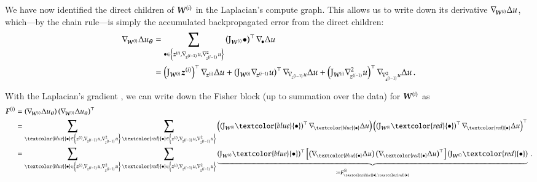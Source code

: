 We have now identified the direct children of ${\boldsymbol{W}}^{(i)}$ in the Laplacian's compute graph.
This allows us to write down its derivative $\nabla_{\!{{\boldsymbol{W}}^{(i)}}} \Delta u$, which---by the chain rule---is simply the accumulated backpropagated error from the direct children:
\begin{align}\label{eq:laplacian-gradient}
  \begin{split}
    \grad{\mW^{(i)}} \Delta u_{\vtheta}
    &=
      \sum_{\bullet \in \left\{ \vz^{(i)}, \grad{\vz^{(i-1)}}u, \gradsquared{\vz^{(i-1)}}u \right\}}
      \left(
      \jac_{\mW^{(i)}}\bullet
      \right)^{\top}
      \grad{\bullet}\Delta u
    \\
    &=
      \left(
      \jac_{\mW^{(i)}}\vz^{(i)}
      \right)^{\top}
      \grad{\vz^{(i)}}\Delta u
      +
      \left(
      \jac_{\mW^{(i)}}\grad{\vz^{(i-1)}}u
      \right)^{\top}
      \grad{\grad{\vz^{(i-1)}}u}\Delta u
      +
      \left(
      \jac_{\mW^{(i)}}\gradsquared{\vz^{(i-1)}}u
      \right)^{\top}
      \grad{\gradsquared{\vz^{(i-1)}}u}\Delta u\,.
  \end{split}
\end{align}

With the Laplacian's gradient , we can write down the Fisher block (up to summation over the data) for ${\boldsymbol{W}}^{(i)}$ as 
\begin{align}\label{eq:fisher}
  \begin{split}
    \mF^{(i)}
    &=
      \left(
      \grad{\mW^{(i)}} \Delta u_{\vtheta}
      \right)
      \left(
      \grad{\mW^{(i)}} \Delta u_{\vtheta}
      \right)^{\top}
    \\
    &=
      \sum_{\textcolor{blue}{\bullet} \in \left\{ \vz^{(i)}, \grad{\vz^{(i-1)}}u, \gradsquared{\vz^{(i-1)}}u \right\}}
      \sum_{\textcolor{red}{\bullet} \in \left\{ \vz^{(i)}, \grad{\vz^{(i-1)}}u, \gradsquared{\vz^{(i-1)}}u \right\}}
      \left(
      \left(
      \jac_{\mW^{(i)}}\textcolor{blue}{\bullet}
      \right)^{\top}
      \grad{\textcolor{blue}{\bullet}}\Delta u
      \right)
      \left(
      \left(
      \jac_{\mW^{(i)}}\textcolor{red}{\bullet}
      \right)^{\top}
      \grad{\textcolor{red}{\bullet}}\Delta u
      \right)^{\top}
    \\
    &=
      \sum_{\textcolor{blue}{\bullet} \in \left\{ \vz^{(i)}, \grad{\vz^{(i-1)}}u, \gradsquared{\vz^{(i-1)}}u \right\}}
      \sum_{\textcolor{red}{\bullet} \in \left\{ \vz^{(i)}, \grad{\vz^{(i-1)}}u, \gradsquared{\vz^{(i-1)}}u \right\}}
      \underbrace{
      \left(
      \jac_{\mW^{(i)}}\textcolor{blue}{\bullet}
      \right)^{\top}
      \left[
      \left(
      \grad{\textcolor{blue}{\bullet}}\Delta u
      \right)
      \left(
      \grad{\textcolor{red}{\bullet}}\Delta u
      \right)^{\top}
      \right]
      \left(
      \jac_{\mW^{(i)}}\textcolor{red}{\bullet}
      \right)}_{
      \coloneqq \mF^{(i)}_{\textcolor{blue}{\bullet}, \textcolor{red}{\bullet}}
      }\,.
  \end{split}
\end{align}


